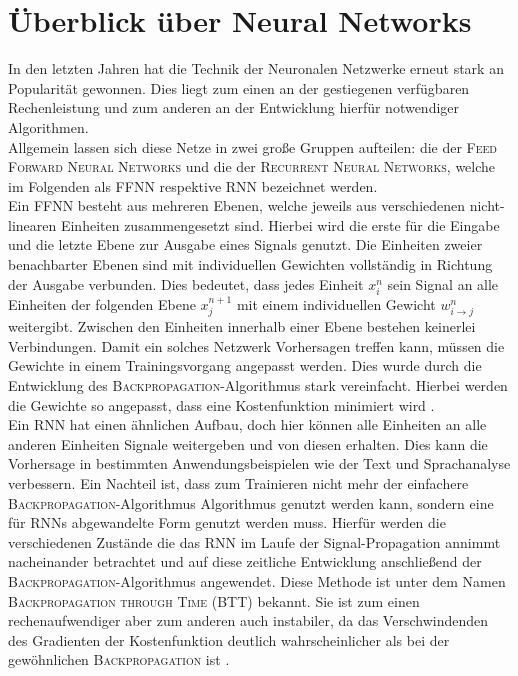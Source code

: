 \section{Überblick über Neural Networks}
In den letzten Jahren hat die Technik der Neuronalen Netzwerke erneut stark an Popularität gewonnen. Dies liegt zum einen an der gestiegenen verfügbaren Rechenleistung und zum anderen an der Entwicklung hierfür notwendiger Algorithmen.\\
Allgemein lassen sich diese Netze in zwei große Gruppen aufteilen: die der \textsc{Feed Forward Neural Networks} und die der \textsc{Recurrent Neural Networks}, welche im Folgenden als \textsc{FFNN} respektive \textsc{RNN} bezeichnet werden.\\

Ein \textsc{FFNN} besteht aus mehreren Ebenen, welche jeweils aus verschiedenen nicht-linearen Einheiten zusammengesetzt sind. Hierbei wird die erste für die Eingabe und die letzte Ebene zur Ausgabe eines Signals genutzt. Die Einheiten zweier benachbarter Ebenen sind mit individuellen Gewichten vollständig in Richtung der Ausgabe verbunden. Dies bedeutet, dass jedes Einheit $x^n_i$ sein Signal an alle Einheiten der folgenden Ebene $x^{n+1}_j$ mit einem individuellen Gewicht $w^n_{i \rightarrow j}$ weitergibt. Zwischen den Einheiten innerhalb einer Ebene bestehen keinerlei Verbindungen.
Damit ein solches Netzwerk Vorhersagen treffen kann, müssen die Gewichte in einem Trainingsvorgang angepasst werden. Dies wurde durch die Entwicklung des \textsc{Backpropagation}-Algorithmus stark vereinfacht. Hierbei werden die Gewichte so angepasst, dass eine Kostenfunktion minimiert wird \cite[S. 225-290]{bishop}.\\

Ein \textsc{RNN} hat einen ähnlichen Aufbau, doch hier können alle Einheiten an alle anderen Einheiten Signale weitergeben und von diesen erhalten. Dies kann die Vorhersage in bestimmten Anwendungsbeispielen wie der Text und Sprachanalyse verbessern. Ein Nachteil ist, dass zum Trainieren nicht mehr der einfachere \textsc{Backpropagation}-Algorithmus Algorithmus genutzt werden kann, sondern eine für \textsc{RNN}s abgewandelte Form genutzt werden muss. Hierfür werden die verschiedenen Zustände die das \textsc{RNN} im Laufe der Signal-Propagation annimmt nacheinander betrachtet und auf diese zeitliche Entwicklung anschließend der \textsc{Backpropagation}-Algorithmus angewendet. Diese Methode ist unter dem Namen \textsc{Backpropagation through Time} (BTT) bekannt. Sie ist zum einen rechenaufwendiger aber zum anderen auch instabiler, da das Verschwindenden des Gradienten der Kostenfunktion deutlich wahrscheinlicher als bei der gewöhnlichen \textsc{Backpropagation} ist \citep{pascanu}.
